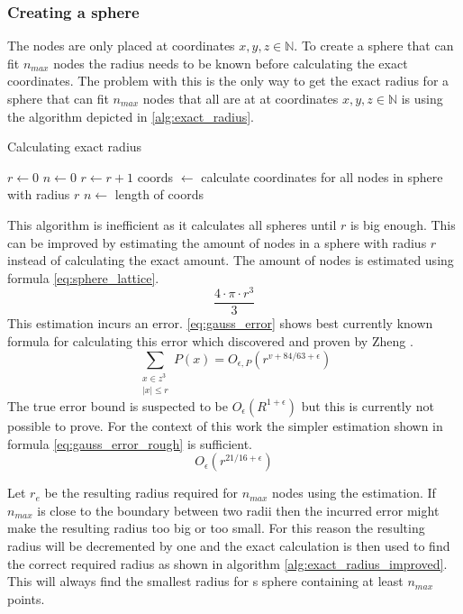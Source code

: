\subsubsection{Creating a sphere}
The nodes are only placed at coordinates $x,y,z \in \mathbb{N}$. To create a sphere that can fit $n_{max}$ nodes the radius needs to be known before calculating the exact coordinates. The problem with this is the only way to get the exact radius for a sphere that can fit $n_{max}$ nodes that all are at at coordinates $x,y,z \in \mathbb{N}$ is using the algorithm depicted in \ref{alg:exact_radius}.
\begin{algorithm}
\caption{Calculating exact radius}
\label{alg:exact_radius}
\begin{algorithmic}
\State $r \gets 0$
\State $n \gets 0$
    \State $r \gets r+1$
    \State coords $\gets$ calculate coordinates for all nodes in sphere with radius $r$
    \State $n \gets $ length of coords
\EndWhile
\end{algorithmic}
\end{algorithm}
This algorithm is inefficient as it calculates all spheres until $r$ is big enough. This can be improved by estimating the amount of nodes in a sphere with radius $r$ instead of calculating the exact amount. The amount of nodes is estimated using formula \ref{eq:sphere_lattice}.
\begin{equation}
\label{eq:sphere_lattice}
    \dfrac{4 \cdot \pi \cdot r^3}{3}
\end{equation}
This estimation incurs an error. \ref{eq:gauss_error} shows best currently known formula for calculating this error which discovered and proven by Zheng \cite{gaussSphereProblem}.
\begin{equation}
\label{eq:gauss_error}
    \sum_{\substack{x \in z^3 \\ |x| \leq r}}{P(x)} = O_{\epsilon, P}(r^{v + 84 / 63 + \epsilon})
\end{equation}
The true error bound is suspected to be $O_\epsilon(R^{1 + \epsilon})$ but this is currently not possible to prove. For the context of this work the simpler estimation shown in formula \ref{eq:gauss_error_rough} is sufficient.
\begin{equation}
\label{eq:gauss_error_rough}
    O_{\epsilon}(r^{21/16 + \epsilon})
\end{equation}

Let $r_e$ be the resulting radius required for $n_{max}$ nodes using the estimation. If $n_{max}$ is close to the boundary between two radii then the incurred error might make the resulting radius too big or too small. For this reason the resulting radius will be decremented by one and the exact calculation is then used to find the correct required radius as shown in algorithm \ref{alg:exact_radius_improved}. This will always find the smallest radius for s sphere containing at least $n_{max}$ points.

